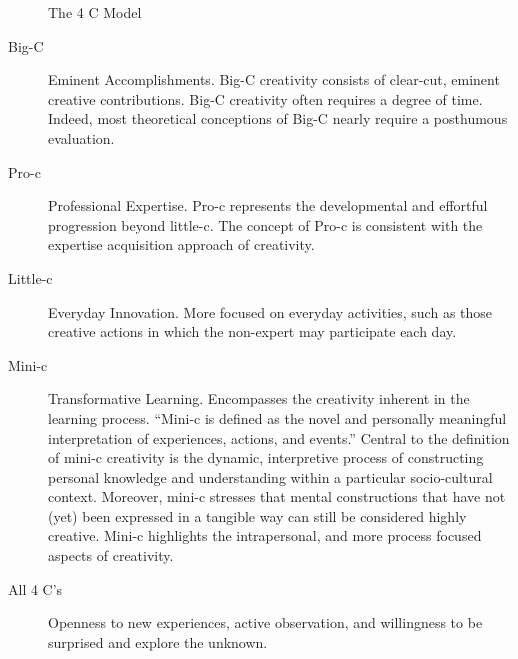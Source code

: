 \begin{figure}[!htbp]
  \centering
\caption[The 4 C Model]{The 4 C Model}
\label{fig:4C}
\end{figure}

\begin{description}
  \item [Big-C] Eminent Accomplishments. Big-C creativity consists of clear-cut, eminent creative contributions. Big-C creativity often requires a degree of time. Indeed, most theoretical conceptions of Big-C nearly require a posthumous evaluation.
  \item [Pro-c] Professional Expertise. Pro-c represents the developmental and effortful progression beyond little-c. The concept of Pro-c is consistent with the expertise acquisition approach of creativity.
  \item [Little-c] Everyday Innovation. More focused on everyday activities, such as those creative actions in which the non-expert may participate each day.
  \item [Mini-c] Transformative Learning. Encompasses the creativity inherent in the learning process. ``Mini-c is defined as the novel and personally meaningful interpretation of experiences, actions, and events.'' \autocite{Beghetto2007} Central to the definition of mini-c creativity is the dynamic, interpretive process of constructing personal knowledge and understanding within a particular socio-cultural context. Moreover, mini-c stresses that mental constructions that have not (yet) been expressed in a tangible way can still be considered highly creative. Mini-c highlights the intrapersonal, and more process focused aspects of creativity.
  \item [All 4 C's] Openness to new experiences, active observation, and willingness to be surprised and explore the unknown.
\end{description}



